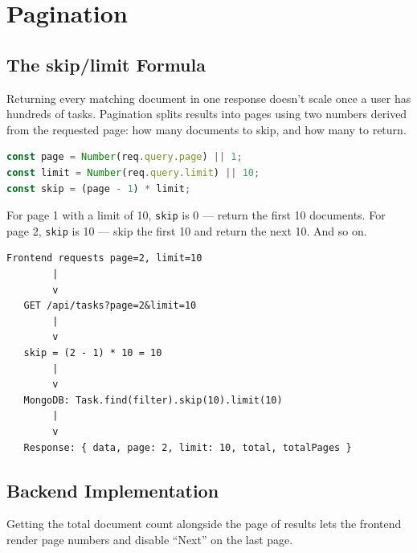 \chapter{Pagination}

\section{The skip/limit Formula}

Returning every matching document in one response doesn't scale once a user
has hundreds of tasks. Pagination splits results into pages using two
numbers derived from the requested page: how many documents to skip, and how
many to return.

\begin{lstlisting}[language=JavaScript]
const page = Number(req.query.page) || 1;
const limit = Number(req.query.limit) || 10;
const skip = (page - 1) * limit;
\end{lstlisting}

For page 1 with a limit of 10, \texttt{skip} is 0 --- return the first 10
documents. For page 2, \texttt{skip} is 10 --- skip the first 10 and return
the next 10. And so on.

\begin{diagrambox}
\begin{verbatim}
Frontend requests page=2, limit=10
        |
        v
   GET /api/tasks?page=2&limit=10
        |
        v
   skip = (2 - 1) * 10 = 10
        |
        v
   MongoDB: Task.find(filter).skip(10).limit(10)
        |
        v
   Response: { data, page: 2, limit: 10, total, totalPages }
\end{verbatim}
\end{diagrambox}

\section{Backend Implementation}

Getting the total document count alongside the page of results lets the
frontend render page numbers and disable ``Next'' on the last page.

